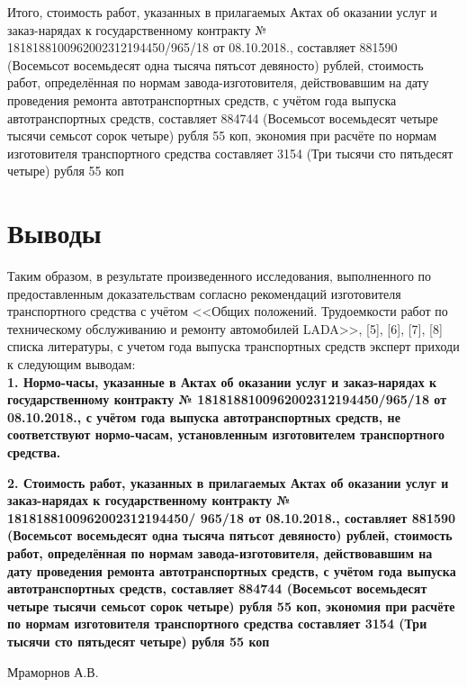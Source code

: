 Итого, стоимость работ, указанных в прилагаемых Актах об оказании услуг и заказ-нарядах к государственному контракту  № 1818188100962002312194450/965/18 от 08.10.2018., составляет 881590 (Восемьсот восемьдесят одна тысяча пятьсот девяносто) рублей, стоимость работ, определённая  по нормам завода-изготовителя, действовавшим на дату проведения ремонта автотранспортных средств, с учётом года выпуска автотранспортных средств, составляет 884744 (Восемьсот восемьдесят четыре тысячи семьсот сорок четыре) рубля 55 коп, экономия при расчёте по нормам изготовителя транспортного средства составляет 3154 (Три тысячи сто пятьдесят четыре) рубля 55 коп




\section{Выводы}

Таким образом, в результате произведенного исследования, выполненного по предоставленным доказательствам   согласно рекомендаций изготовителя транспортного средства с учётом <<Общих положений. Трудоемкости работ по техническому обслуживанию и ремонту автомобилей LADA>>, [5], [6], [7], [8] списка литературы, с учетом года выпуска транспортных средств эксперт приходи к следующим выводам:\\

\textbf{1. Нормо-часы, указанные в Актах об оказании услуг и заказ-нарядах к государственному контракту № 1818188100962002312194450/965/18 от 08.10.2018., с учётом года выпуска автотранспортных средств, не соответствуют нормо-часам, установленным   изготовителем транспортного средства.}
	
\vspace{4mm}
	
\textbf{2. Стоимость работ, указанных в прилагаемых Актах об оказании услуг и заказ-нарядах к государственному контракту  № 1818188100962002312194450/  965/18 от 08.10.2018., составляет 881590 (Восемьсот восемьдесят одна тысяча пятьсот девяносто) рублей, стоимость работ, определённая  по нормам завода-изготовителя, действовавшим на дату проведения ремонта автотранспортных средств, с учётом года выпуска автотранспортных средств, составляет 884744 (Восемьсот восемьдесят четыре тысячи семьсот сорок четыре) рубля 55 коп, экономия при расчёте по нормам изготовителя транспортного средства составляет 3154 (Три тысячи сто пятьдесят четыре) рубля 55 коп}



\relax

\vspace{20mm}

\hfill           {Мраморнов А.В.}

%
%